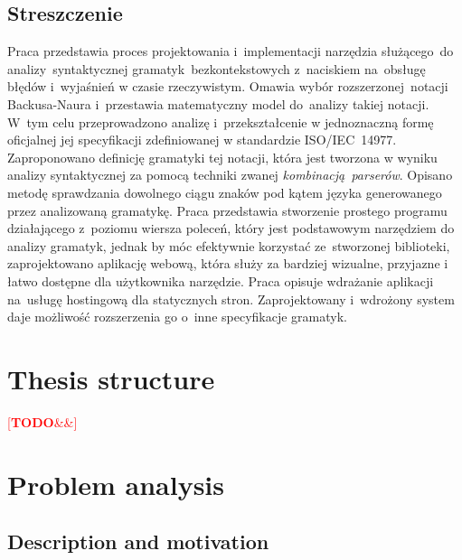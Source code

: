 \documentclass[english,engineering]{wizthesis}
\newcommand{\todo}[1]{%
  \textcolor{red}{[\textbf{TODO}\ifx&#1&{}\else{ }\fi\emph{#1}]}%
}
\begin{document}
{\let\clearpage\relax %
\begin{otherlanguage}{polish}

\chapter*{Streszczenie}

Praca przedstawia proces projektowania i~implementacji narzędzia służącego~do
analizy~syntaktycznej gramatyk~bezkontekstowych z~naciskiem na~obsługę błędów
i~wyjaśnień w czasie rzeczywistym. Omawia wybór rozszerzonej~notacji
Backusa-Naura i~przestawia matematyczny model do~analizy takiej notacji. W~tym
celu przeprowadzono analizę i~przekształcenie w jednoznaczną formę oficjalnej
jej specyfikacji zdefiniowanej w standardzie ISO/IEC~14977. Zaproponowano
definicję gramatyki tej notacji, która jest tworzona w wyniku analizy
syntaktycznej za pomocą techniki zwanej \emph{kombinacją~parserów}. Opisano
metodę sprawdzania dowolnego ciągu znaków pod kątem języka generowanego przez
analizowaną gramatykę. Praca przedstawia stworzenie prostego programu
działającego z~poziomu wiersza poleceń, który jest podstawowym narzędziem do
analizy gramatyk, jednak by móc efektywnie korzystać ze~stworzonej biblioteki,
zaprojektowano aplikację webową, która służy za bardziej wizualne, przyjazne i
łatwo dostępne dla użytkownika narzędzie. Praca opisuje wdrażanie aplikacji
na~usługę hostingową dla statycznych stron. Zaprojektowany i~wdrożony system
daje możliwość rozszerzenia go o~inne specyfikacje gramatyk.

\end{otherlanguage}
}

\tableofcontents

\chapter*{Thesis structure}

\todo{}

\mainmatter %

\chapter{Problem analysis} \label{ch:problem-analysis}

\section{Description and motivation} \label{sec:description-and-motivation}
\end{document}
